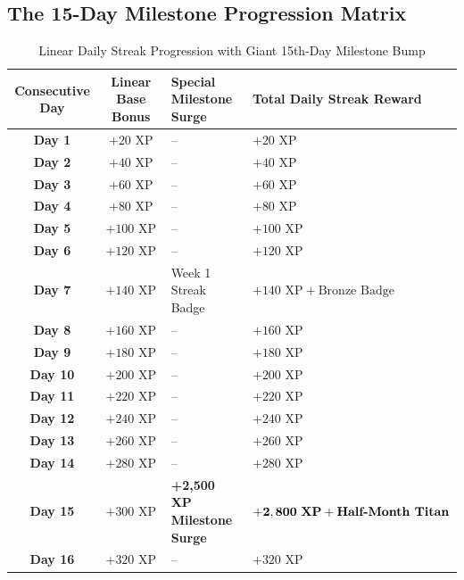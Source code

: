 \subsection{The 15-Day Milestone Progression Matrix}
\begin{table}[htbp]
\centering
\footnotesize
\begin{tabular}{|c|c|p{4.5cm}|p{4.5cm}|}
\hline
\rowcolor{primaryBlue!15}
\textbf{Consecutive Day} & \textbf{Linear Base Bonus} & \textbf{Special Milestone Surge} & \textbf{Total Daily Streak Reward} \\ \hline
\textbf{Day 1} & $+20\text{ XP}$ & -- & $+20\text{ XP}$ \\ \hline
\textbf{Day 2} & $+40\text{ XP}$ & -- & $+40\text{ XP}$ \\ \hline
\textbf{Day 3} & $+60\text{ XP}$ & -- & $+60\text{ XP}$ \\ \hline
\textbf{Day 4} & $+80\text{ XP}$ & -- & $+80\text{ XP}$ \\ \hline
\textbf{Day 5} & $+100\text{ XP}$ & -- & $+100\text{ XP}$ \\ \hline
\textbf{Day 6} & $+120\text{ XP}$ & -- & $+120\text{ XP}$ \\ \hline
\textbf{Day 7} & $+140\text{ XP}$ & Week 1 Streak Badge & $+140\text{ XP} + \text{Bronze Badge}$ \\ \hline
\textbf{Day 8} & $+160\text{ XP}$ & -- & $+160\text{ XP}$ \\ \hline
\textbf{Day 9} & $+180\text{ XP}$ & -- & $+180\text{ XP}$ \\ \hline
\textbf{Day 10} & $+200\text{ XP}$ & -- & $+200\text{ XP}$ \\ \hline
\textbf{Day 11} & $+220\text{ XP}$ & -- & $+220\text{ XP}$ \\ \hline
\textbf{Day 12} & $+240\text{ XP}$ & -- & $+240\text{ XP}$ \\ \hline
\textbf{Day 13} & $+260\text{ XP}$ & -- & $+260\text{ XP}$ \\ \hline
\textbf{Day 14} & $+280\text{ XP}$ & -- & $+280\text{ XP}$ \\ \hline
\rowcolor{accentAmber!20}
\textbf{Day 15} & $+300\text{ XP}$ & \textbf{+2,500 XP Milestone Surge} & $\mathbf{+2,800\text{ \textbf{XP}}} + \text{\textbf{Half-Month Titan}}$ \\ \hline
\textbf{Day 16} & $+320\text{ XP}$ & -- & $+320\text{ XP}$ \\ \hline
\end{tabular}
\caption{Linear Daily Streak Progression with Giant 15th-Day Milestone Bump}
\end{table}

